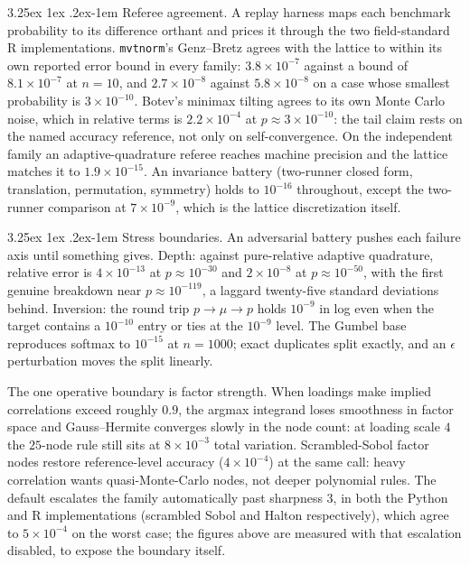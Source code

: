 \documentclass[11pt]{article}
\makeatletter
\renewcommand\paragraph{\@startsection{paragraph}{4}{\z@}%
  {3.25ex \@plus1ex \@minus.2ex}{-1em}%
  {\normalfont\normalsize\itshape}}
\makeatother
\begin{document}
\paragraph{Referee agreement.} A replay harness maps each benchmark
probability to its difference orthant and prices it through the two
field-standard R implementations. \texttt{mvtnorm}'s Genz--Bretz agrees with
the lattice to within its own reported error bound in every family:
$3.8\times10^{-7}$ against a bound of $8.1\times10^{-7}$ at $n=10$, and
$2.7\times10^{-8}$ against $5.8\times10^{-8}$ on a case whose smallest
probability is $3\times10^{-10}$. Botev's minimax tilting agrees to its own
Monte Carlo noise, which in relative terms is $2.2\times10^{-4}$ at
$p\approx3\times10^{-10}$: the tail claim rests on the named accuracy
reference, not only on self-convergence. On the independent family an
adaptive-quadrature referee reaches machine precision and the lattice matches
it to $1.9\times10^{-15}$. An invariance battery (two-runner closed form,
translation, permutation, symmetry) holds to $10^{-16}$ throughout, except
the two-runner comparison at $7\times10^{-9}$, which is the lattice
discretization itself.

\paragraph{Stress boundaries.} An adversarial battery pushes each failure
axis until something gives. Depth: against pure-relative adaptive
quadrature, relative error is $4\times10^{-13}$ at $p\approx10^{-30}$ and
$2\times10^{-8}$ at $p\approx10^{-50}$, with the first genuine breakdown
near $p\approx10^{-119}$, a laggard twenty-five standard deviations behind.
Inversion: the round trip $p\to\mu\to p$ holds $10^{-9}$ in log even when
the target contains a $10^{-10}$ entry or ties at the $10^{-9}$ level. The
Gumbel base reproduces softmax to $10^{-15}$ at $n=1000$; exact duplicates
split exactly, and an $\epsilon$ perturbation moves the split linearly.

The one operative boundary is factor strength. When loadings make implied
correlations exceed roughly $0.9$, the argmax integrand loses smoothness in
factor space and Gauss--Hermite converges slowly in the node count: at
loading scale $4$ the $25$-node rule still sits at $8\times10^{-3}$ total
variation. Scrambled-Sobol factor nodes restore reference-level accuracy
($4\times10^{-4}$) at the same call: heavy correlation wants
quasi-Monte-Carlo nodes, not deeper polynomial rules. The default
escalates the family automatically past sharpness $3$, in both the Python
and R implementations (scrambled Sobol and Halton respectively), which
agree to $5\times10^{-4}$ on the worst case; the figures above are
measured with that escalation disabled, to expose the boundary itself.
\end{document}
